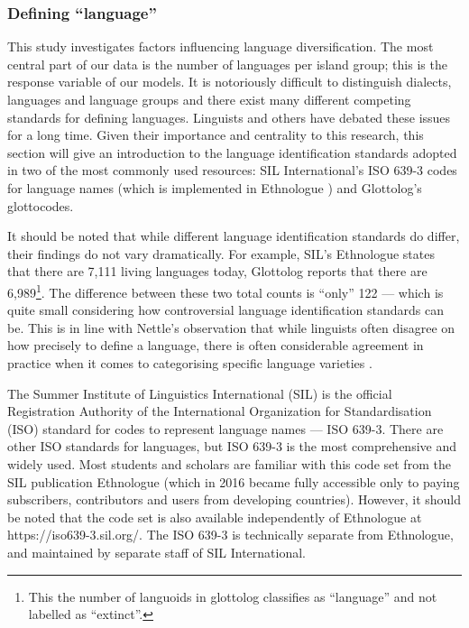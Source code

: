 \documentclass[a4paper,10pt]{article} %
\begin{document}
\FloatBarrier
\subsubsection{Defining ``language''}
\label{sec:language_class}
This study investigates factors influencing language diversification. The most central part of our data is the number of languages per island group; this is the response variable of our models. It is notoriously difficult to distinguish dialects, languages and language groups and there exist many different competing standards for defining languages. Linguists and others have debated these issues for a long time. Given their importance and centrality to this research, this section will give an introduction to the language identification standards adopted in two of the most commonly used resources: SIL International's ISO 639-3 codes for language names (which is implemented in Ethnologue \citep{ethnologue22}) and Glottolog's glottocodes.

It should be noted that while different language identification standards do differ, their findings do not vary dramatically. For example, SIL's Ethnologue states that there are 7,111 living languages today, Glottolog reports that there are 6,989\footnote{This the number of languoids in glottolog classifies as ``language'' and not labelled as ``extinct''.}. The difference between these two total counts is ``only'' 122 --- which is quite small considering how controversial language identification standards can be. This is in line with Nettle's observation that while linguists often disagree on how precisely to define a language, there is often considerable agreement in practice when it comes to categorising specific language varieties \citep[356]{NETTLE1998}.

The Summer Institute of Linguistics International (SIL) is the official Registration Authority of the International Organization for Standardisation (ISO) standard for codes to represent language names --- ISO 639-3. There are other ISO standards for languages, but ISO 639-3 is the most comprehensive and widely used. Most students and scholars are familiar with this code set from the SIL publication Ethnologue (which in 2016 became fully accessible only to paying subscribers, contributors and users from developing countries). However, it should be noted that the code set is also available independently of Ethnologue at https://iso639-3.sil.org/. The ISO 639-3 is technically separate from Ethnologue, and maintained by separate staff of SIL International.
\end{document}
